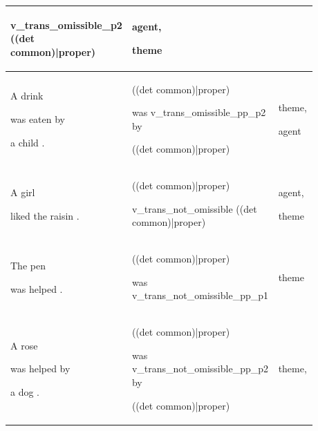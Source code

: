 \documentclass[11pt]{article}
\begin{document}
\begin{table}
\begin{tabular}{p{0.225\linewidth} p{0.50\linewidth} p{0.15\linewidth}}
\begin{tiny}
v\_trans\_omissible\_p2 ((det common)|proper)\end{tiny} & \begin{tiny} agent,

theme \end{tiny} \\
\hline
\begin{tiny}A drink 

was eaten by 

a child .\end{tiny} & \begin{tiny}((det common)|proper)

was v\_trans\_omissible\_pp\_p2 by 

((det common)|proper)\end{tiny} & \begin{tiny}theme,

agent\end{tiny} \\
\hline
\begin{tiny}A girl 

liked the raisin .\end{tiny} & \begin{tiny}((det common)|proper)

v\_trans\_not\_omissible ((det common)|proper)\end{tiny} & \begin{tiny}agent,

theme\end{tiny} \\
\hline
\begin{tiny}The pen 

was helped .\end{tiny} & \begin{tiny}((det common)|proper)

was v\_trans\_not\_omissible\_pp\_p1\end{tiny} & \begin{tiny}theme\end{tiny} \\
\hline
\begin{tiny}A rose 

was helped by

a dog .\end{tiny} & \begin{tiny}((det common)|proper)

was v\_trans\_not\_omissible\_pp\_p2 by 

((det common)|proper)\end{tiny} & \begin{tiny}theme,


\end{tiny}
\end{tabular}
\end{table}
\end{document}
